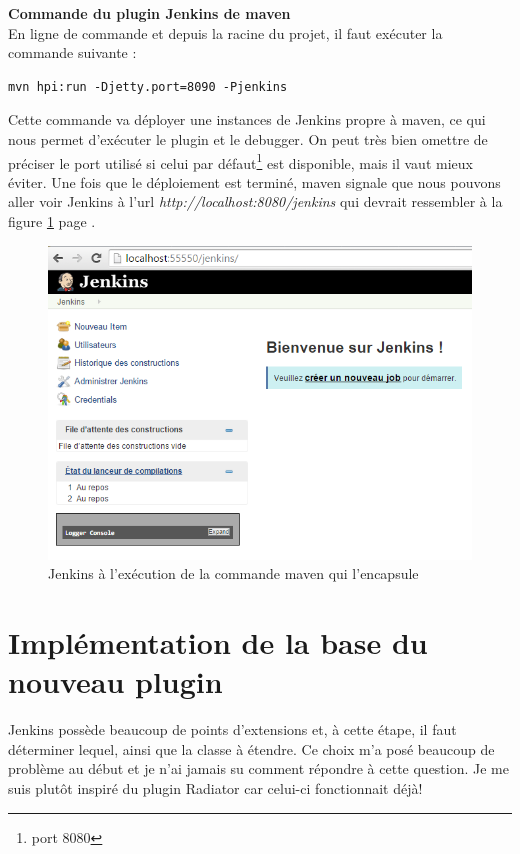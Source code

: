 \textbf{Commande du plugin Jenkins de maven}\hfill \\ \indent 
En ligne de commande et depuis la racine du projet, il faut exécuter la commande suivante :
\begin{lstlisting}
mvn hpi:run -Djetty.port=8090 -Pjenkins
\end{lstlisting}
Cette commande va déployer une instances de Jenkins propre à maven, ce qui nous permet d'exécuter le plugin et le debugger. On peut très bien omettre de préciser le port utilisé si celui par défaut\footnote{port 8080} est disponible, mais il vaut mieux éviter. Une fois que le déploiement est terminé, maven signale que  nous pouvons aller voir Jenkins à l'url \emph{http://localhost:8080/jenkins} qui devrait ressembler à la figure \ref{figure:firstJenkinsWhenGenerateTheSkeletonPlugin} page \pageref{figure:firstJenkinsWhenGenerateTheSkeletonPlugin}.
\begin{figure}[!h]
  \centering
      \includegraphics[width=\textwidth]{images/firstJenkinsWhenGenerateTheSkeletonPlugin.png}
  \caption{Jenkins à l'exécution de la commande maven qui l'encapsule}
	\label{figure:firstJenkinsWhenGenerateTheSkeletonPlugin}
\end{figure}




\section{Implémentation de la base du nouveau plugin}


Jenkins possède beaucoup de points d'extensions et, à cette étape, il faut déterminer lequel, ainsi que la classe à étendre. Ce choix m'a posé beaucoup de problème au début et je n'ai jamais su comment répondre à cette question. Je me suis plutôt inspiré du plugin Radiator car celui-ci fonctionnait déjà!\\

